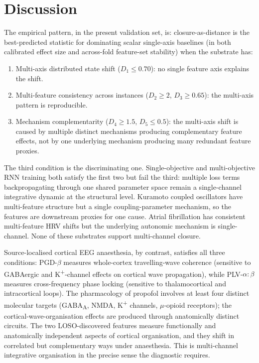\documentclass[11pt,a4paper]{article}
\begin{document}
\section{Discussion}\label{sec:discussion}

The empirical pattern, in the present validation set, is: closure-as-distance is the best-predicted statistic for dominating scalar single-axis baselines (in both calibrated effect size and across-fold feature-set stability) when the substrate has:
\begin{enumerate}\itemsep0pt
\item Multi-axis distributed state shift ($D_1 \leq 0.70$): no single feature axis explains the shift.
\item Multi-feature consistency across instances ($D_2 \geq 2$, $D_3 \geq 0.65$): the multi-axis pattern is reproducible.
\item Mechanism complementarity ($D_4 \geq 1.5$, $D_5 \leq 0.5$): the multi-axis shift is caused by multiple distinct mechanisms producing complementary feature effects, not by one underlying mechanism producing many redundant feature proxies.
\end{enumerate}

The third condition is the discriminating one. Single-objective and multi-objective RNN training both satisfy the first two but fail the third: multiple loss terms backpropagating through one shared parameter space remain a single-channel integrative dynamic at the structural level. Kuramoto coupled oscillators have multi-feature structure but a single coupling-parameter mechanism, so the features are downstream proxies for one cause. Atrial fibrillation has consistent multi-feature HRV shifts but the underlying autonomic mechanism is single-channel. None of these substrates support multi-channel closure.

Source-localised cortical EEG anaesthesia, by contrast, satisfies all three conditions: PGD-$\beta$ measures whole-cortex travelling-wave coherence (sensitive to GABAergic and K\textsuperscript{+}-channel effects on cortical wave propagation), while PLV-$\alpha{:}\beta$ measures cross-frequency phase locking (sensitive to thalamocortical and intracortical loops). The pharmacology of propofol involves at least four distinct molecular targets (GABA\textsubscript{A}, NMDA, K\textsuperscript{+} channels, $\mu$-opioid receptors); the cortical-wave-organisation effects are produced through anatomically distinct circuits. The two LOSO-discovered features measure functionally and anatomically independent aspects of cortical organisation, and they shift in correlated but complementary ways under anaesthesia. This is multi-channel integrative organisation in the precise sense the diagnostic requires.
\end{document}
